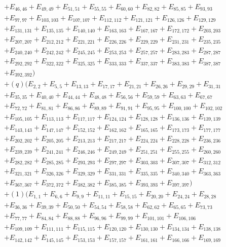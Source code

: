 \documentclass[10pt,a4paper]{amsart}
\numberwithin{equation}{section}
\theoremstyle{definition}
\begin{document}
\begin{align*}
&+E_{46,46}+E_{49,49}+E_{51,51}+E_{55,55}+E_{60,60}+E_{82,82}+E_{85,85}+E_{93,93}\\
&+E_{97,97}+E_{103,103}+E_{107,107}+E_{112,112}+E_{121,121}+E_{126,126}+E_{129,129}\\
&+E_{131,131}+E_{135,135}+E_{140,140}+E_{163,163}+E_{167,167}+E_{172,172}+E_{203,203}\\
&+E_{207,207}+E_{212,212}+E_{221,221}+E_{226,226}+E_{229,229}+E_{231,231}+E_{235,235}\\
&+E_{240,240}+E_{242,242}+E_{245,245}+E_{253,253}+E_{257,257}+E_{283,283}+E_{287,287}\\
&+E_{292,292}+E_{322,322}+E_{325,325}+E_{333,333}+E_{337,337}+E_{383,383}+E_{387,387}\\
&+E_{392,392})\\
&+(q)(E_{2,2}+E_{5,5}+E_{13,13}+E_{17,17}+E_{21,21}+E_{26,26}+E_{29,29}+E_{31,31}\\
&+E_{35,35}+E_{40,40}+E_{44,44}+E_{48,48}+E_{56,56}+E_{59,59}+E_{63,63}+E_{67,67}\\
&+E_{72,72}+E_{81,81}+E_{86,86}+E_{89,89}+E_{91,91}+E_{95,95}+E_{100,100}+E_{102,102}\\
&+E_{105,105}+E_{113,113}+E_{117,117}+E_{124,124}+E_{128,128}+E_{136,136}+E_{139,139}\\
&+E_{143,143}+E_{147,147}+E_{152,152}+E_{162,162}+E_{165,165}+E_{173,173}+E_{177,177}\\
&+E_{202,202}+E_{205,205}+E_{213,213}+E_{217,217}+E_{224,224}+E_{228,228}+E_{236,236}\\
&+E_{239,239}+E_{241,241}+E_{246,246}+E_{249,249}+E_{251,251}+E_{255,255}+E_{260,260}\\
&+E_{282,282}+E_{285,285}+E_{293,293}+E_{297,297}+E_{303,303}+E_{307,307}+E_{312,312}\\
&+E_{321,321}+E_{326,326}+E_{329,329}+E_{331,331}+E_{335,335}+E_{340,340}+E_{363,363}\\
&+E_{367,367}+E_{372,372}+E_{382,382}+E_{385,385}+E_{393,393}+E_{397,397})\\
&+(1)(E_{1,1}+E_{6,6}+E_{9,9}+E_{11,11}+E_{15,15}+E_{20,20}+E_{24,24}+E_{28,28}\\
&+E_{36,36}+E_{39,39}+E_{50,50}+E_{54,54}+E_{58,58}+E_{62,62}+E_{65,65}+E_{73,73}\\
&+E_{77,77}+E_{84,84}+E_{88,88}+E_{96,96}+E_{99,99}+E_{101,101}+E_{106,106}\\
&+E_{109,109}+E_{111,111}+E_{115,115}+E_{120,120}+E_{130,130}+E_{134,134}+E_{138,138}\\
&+E_{142,142}+E_{145,145}+E_{153,153}+E_{157,157}+E_{161,161}+E_{166,166}+E_{169,169}\\

\end{align*}
\end{document}
